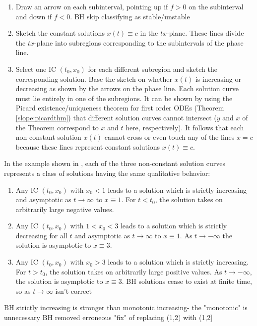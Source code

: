 \documentclass[12pt]{book}
\begin{document}
\begin{example}
\begin{enumerate}[Step 1)]
\item Draw an arrow on each subinterval,
pointing up if $f>0$ on the subinterval and down if $f<0$.
{\color{teal}BH skip classifying as stable/unstable}
\item
Sketch the constant solutions $x(t) \equiv c$ in the $tx$-plane.
These lines divide the $tx$-plane into subregions corresponding to
the subintervals of the phase line.

\item Select one IC $(t_0,x_0)$ for each different subregion 
 and sketch the corresponding solution.
Base the sketch on whether $x(t)$ is increasing or decreasing
as shown by the arrows on the phase line.
Each solution curve must lie entirely in one of the subregions.
It can be shown by using the Picard existence/uniqueness theorem for first order ODEs (Theorem \ref{slope:picardthm}) that different solution curves cannot intersect 
($y$ and $x$ of the Theorem correspond to $x$ and $t$ here, respectively).
It follows that each non-constant solution $x(t)$ cannot cross or even touch any of the lines $x=c$ because these lines represent constant solutions $x(t)\equiv c$.

\end{enumerate}
In the example shown in , each of the three non-constant solution curves  represents
a class of solutions having the same qualitative behavior:

\begin{enumerate}[1)]
    \item Any IC $(t_0,x_0)$ with $x_0 < 1$ 
    leads to a solution which is strictly increasing and asymptotic as $t\to\infty$ to $x\equiv 1$. 
    For $t<t_0$, the solution takes on arbitrarily large negative values.
    \item Any IC $(t_0,x_0)$ with $1 < x_0 < 3$ leads to a solution which is
    strictly decreasing for all $t$ and asymptotic as $t\to\infty$ to $x\equiv 1$. As $t\to-\infty$ the solution is asymptotic to $x\equiv 3$.
    \item Any IC $(t_0,x_0)$ with $x_0>3$ 
    leads to a solution which is
    strictly increasing. For  $t>t_0$, the solution takes on arbitrarily large positive values. As $t\to -\infty$,
    the solution is asymptotic to $x\equiv 3$.
    {\color{teal}BH solutions cease to exist at finite time, so as $t\to\infty$
    isn't correct}
\end{enumerate}
{\color{teal}BH strictly increasing is stronger than monotonic increasing-
the "monotonic" is unnecessary }
{\color{teal}BH removed erroneous "fix" of replacing (1,2) with (1,2]}

\end{example}
\end{document}
